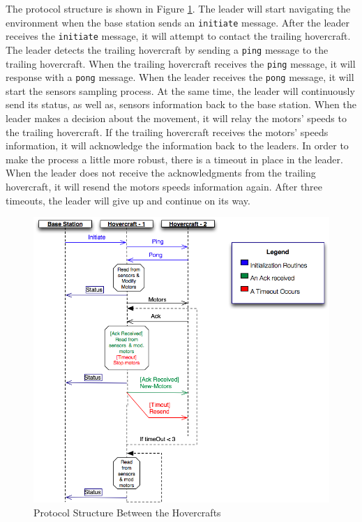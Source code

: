 The protocol structure is shown in Figure \ref{fig:protocol}. The leader will
start navigating the environment when the base station sends an
\texttt{initiate} message. After the leader receives the \texttt{initiate}
message, it will attempt to contact the trailing hovercraft. The leader detects
the trailing hovercraft by sending a \texttt{ping} message to the trailing
hovercraft. When the trailing hovercraft receives the \texttt{ping} message, it
will response with a \texttt{pong} message. When the leader receives the
\texttt{pong} message, it will start the sensors sampling process. At the same
time, the leader will continuously send its status, as well as, sensors
information back to the base station. When the leader makes a decision about
the movement, it will relay the motors' speeds to the trailing hovercraft. If
the trailing hovercraft receives the motors' speeds information, it will
acknowledge the information back to the leaders. In order to make the process a
little more robust, there is a timeout in place in the leader. When the leader
does not receive the acknowledgments from the trailing hovercraft, it will
resend the motors speeds information again. After three timeouts, the leader
will give up and continue on its way.
\begin{figure}[thp]
  \begin{center}
    \includegraphics[width=130mm]{imageSources/messages.png}
  \end{center}
  \caption{Protocol Structure Between the Hovercrafts} 
  \label{fig:protocol}
\end{figure}


